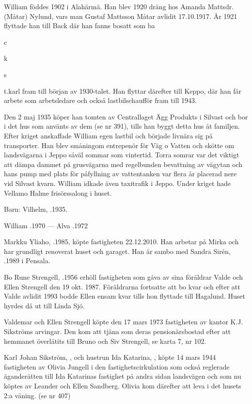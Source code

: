 William föddes 1902 i Alahärmä. Han blev 1920 dräng hos Amanda Mattsdr.(Måtar) Nylund, vars man Gustaf Mattsson Måtar avlidit 17.10.1917. År 1921 flyttade han till Back där han fanns bosatt som ba{c{k{s{t{}.karl fram till början av 1930-talet. Han flyttar därefter till Keppo, där han får arbete som arbetsledare och också lastbilschaufför fram till 1943.

Den 2 maj 1935 köper han tomten av Centrallaget Ägg Produkts i Silvast och bor i det hus som använts av dem (se nr 391), tills han byggt detta hus åt familjen. Efter kriget anskaffade William egen lastbil och började livnära sig på transporter. Han blev småningom entrepenör för Väg o Vatten och skötte om landsvägarna i Jeppo såväl sommar som vintertid. Torra somrar var det viktigt att dämpa dammet på grusvägarna med regelbunden bevattning av vägytan och hans pump med plats för påfyllning av vattentanken var flera år placerad nere vid Silvast kvarn. William idkade även taxitrafik i Jeppo. Under kriget hade Vellamo Halme frisörssalong i huset.

Barn:  Vilhelm, .1935.

William .1970  ---  Alva .1972






Markku Yliaho, .1985, köpte fastigheten 22.12.2010. Han arbetar på Mirka och har grundligt renoverat huset och garaget. Han är sambo med Sandra Sirén, .1989 i Pensala.


Bo Rune Strengell, .1956 erhöll fastigheten som gåva av sina föräldrar Valde och Ellen Strengell den 19 okt. 1987. Föräldrarna fortsatte att bo kvar och efter att Valde avlidit 1993 bodde Ellen ensam kvar tills hon flyttade till Hagalund. Huset hyrdes då ut till Linda Sjö.


Valdemar och Ellen Strengell köpte den 17 mars 1973 fastigheten av kantor K.J. Sikströms arvingar. Den kom att tjäna som deras pensionärsbostad efter att hemmanet överlåtits till Bruno och Siv Strengell, se karta 7, nr 102.


Karl Johan Sikström, , och hustrun Ida Katarina, , köpte 14 mars 1944 fastigheten av Olivia Jungell i den fastighetscirkulation som också reglerade äganderätten till Ida Katarinas fastighet på andra sidan landsvägen och som nu köptes av Leander och Ellen Sandberg. Olivia kom därefter att leva i det husets 2:a våning. (se nr 407)

}}}}
